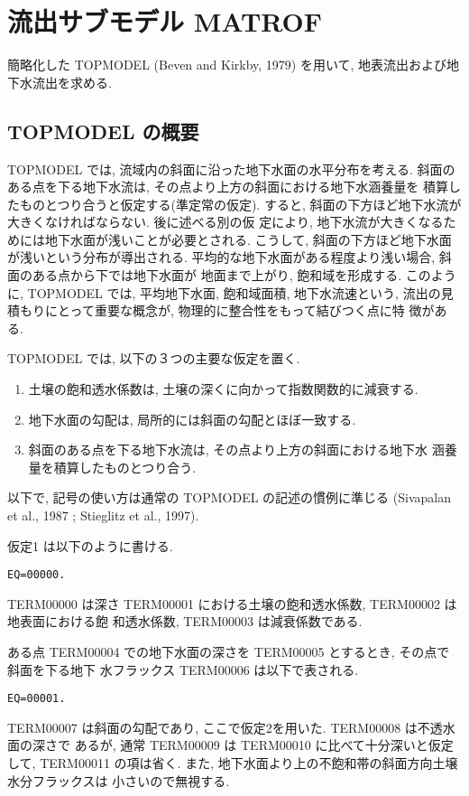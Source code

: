 
\section{流出サブモデル MATROF}

簡略化した TOPMODEL (Beven and Kirkby, 1979) を用いて, 地表流出および地
下水流出を求める.

\subsection{TOPMODEL の概要}

TOPMODEL では, 流域内の斜面に沿った地下水面の水平分布を考える.
斜面のある点を下る地下水流は, その点より上方の斜面における地下水涵養量を
積算したものとつり合うと仮定する(準定常の仮定).
すると, 斜面の下方ほど地下水流が大きくなければならない. 後に述べる別の仮
定により, 地下水流が大きくなるためには地下水面が浅いことが必要とされる.
こうして, 斜面の下方ほど地下水面が浅いという分布が導出される.
平均的な地下水面がある程度より浅い場合, 斜面のある点から下では地下水面が
地面まで上がり, 飽和域を形成する.
このように, TOPMODEL では, 平均地下水面, 飽和域面積, 地下水流速という,
流出の見積もりにとって重要な概念が, 物理的に整合性をもって結びつく点に特
徴がある.

TOPMODEL では, 以下の３つの主要な仮定を置く.
\begin{enumerate}
  \item 土壌の飽和透水係数は, 土壌の深くに向かって指数関数的に減衰する.
  \item 地下水面の勾配は, 局所的には斜面の勾配とほぼ一致する.
  \item 斜面のある点を下る地下水流は, その点より上方の斜面における地下水
        涵養量を積算したものとつり合う.
\end{enumerate}

以下で, 記号の使い方は通常の TOPMODEL の記述の慣例に準じる
(Sivapalan et al., 1987 ; Stieglitz et al., 1997).

仮定1 は以下のように書ける.
\begin{verbatim}
EQ=00000.
\end{verbatim}
TERM00000 は深さ TERM00001 における土壌の飽和透水係数, TERM00002 は地表面における飽
和透水係数, TERM00003 は減衰係数である.

ある点 TERM00004 での地下水面の深さを TERM00005 とするとき, その点で斜面を下る地下
水フラックス TERM00006 は以下で表される.
\begin{verbatim}
EQ=00001.
\end{verbatim}
TERM00007 は斜面の勾配であり, ここで仮定2を用いた. TERM00008 は不透水面の深さで
あるが, 通常 TERM00009 は TERM00010 に比べて十分深いと仮定して, TERM00011
の項は省く. また, 地下水面より上の不飽和帯の斜面方向土壌水分フラックスは
小さいので無視する.

